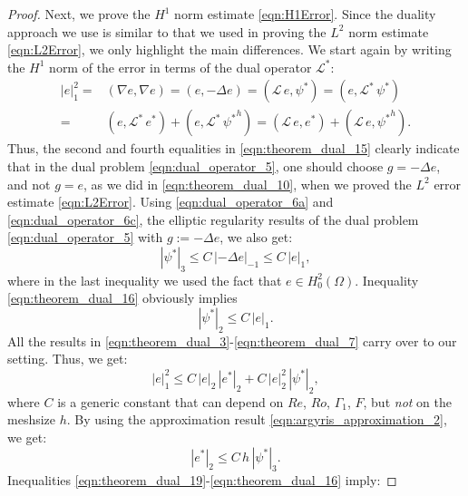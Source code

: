 \begin{proof}
  Next, we prove the $H^1$ norm estimate \eqref{eqn:H1Error}.  Since the duality
  approach we use is similar to that we used in proving the  $L^2$ norm estimate
  \eqref{eqn:L2Error}, we only highlight the main differences.  We start again
  by writing the $H^1$ norm of the error in terms of the dual operator
  $\mathcal{L}^*$:
  \begin{align}
    |e|_1^2 =& (\nabla e , \nabla e) = ( e , - \Delta e) =
      (\mathcal{L} \, e , \psi^*) = (e , \mathcal{L}^* \, \psi^*) \nonumber \\
    =& (e , \mathcal{L}^* \, e^*) + (e , \mathcal{L}^* \, {\psi^*}^h)
      = (\mathcal{L} \, e , e^*) + (\mathcal{L} \, e , {\psi^*}^h) .
    \label{eqn:theorem_dual_15}
  \end{align}
  Thus, the second and fourth equalities in \eqref{eqn:theorem_dual_15} clearly
  indicate that in the dual problem \eqref{eqn:dual_operator_5}, one should
  choose $g = - \Delta e$, and not $g = e$, as we did in
  \eqref{eqn:theorem_dual_10}, when we proved the $L^2$ error estimate
  \eqref{eqn:L2Error}.  Using \eqref{eqn:dual_operator_6a} and
  \eqref{eqn:dual_operator_6c}, the elliptic regularity results of the dual
  problem \eqref{eqn:dual_operator_5} with $g :=  - \Delta e$, we also get:
  \begin{equation}
    | \psi^* |_3 \leq C \, | - \Delta e |_{-1} \leq C \, | e |_1 ,
    \label{eqn:theorem_dual_16}
  \end{equation}
  where in the last inequality we used the fact that $e \in H_0^2(\Omega)$.
  Inequality \eqref{eqn:theorem_dual_16} obviously implies
  \begin{equation}
    | \psi^* |_2 \leq C \, | e |_1 .
    \label{eqn:theorem_dual_17}
  \end{equation}
  All the results in \eqref{eqn:theorem_dual_3}-\eqref{eqn:theorem_dual_7} carry
  over to our setting.  Thus, we get:
  \begin{equation}
    |e|_1^2 \leq C \, | e |_2 \, |e^* |_2 + C \, | e |_2^2 \, | \psi^* |_2 ,
    \label{eqn:theorem_dual_18}
  \end{equation}
  where $C$ is a generic constant that can depend on $Re$, $Ro$, $\Gamma_1$,
  $F$, but \emph{not} on the meshsize $h$.  By using the approximation result
  \eqref{eqn:argyris_approximation_2}, we get:
  \begin{equation}
    |e^* |_2 \leq C \, h \, | \psi^* |_3 .
    \label{eqn:theorem_dual_19}
  \end{equation}
  Inequalities \eqref{eqn:theorem_dual_19}-\eqref{eqn:theorem_dual_16} imply:

\end{proof}
